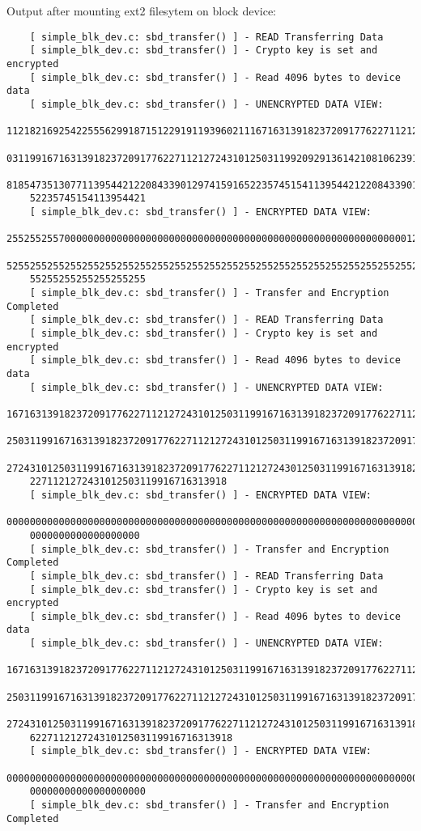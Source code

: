 \documentclass[onecolumn, draftclsnofoot,10pt, compsoc]{IEEEtran}
\begin{document}
\begin{enumerate}
    Output after mounting ext2 filesytem on block device:
    \begin{lstlisting}
    [ simple_blk_dev.c: sbd_transfer() ] - READ Transferring Data
    [ simple_blk_dev.c: sbd_transfer() ] - Crypto key is set and encrypted
    [ simple_blk_dev.c: sbd_transfer() ] - Read 4096 bytes to device data
    [ simple_blk_dev.c: sbd_transfer() ] - UNENCRYPTED DATA VIEW:
    11218216925422555629918715122919119396021116716313918237209177622711212724310125
    03119916716313918237209177622711212724310125031199209291361421081062391354813514
    81854735130771139544212208433901297415916522357451541139544212208433901297415916
    52235745154113954421
    [ simple_blk_dev.c: sbd_transfer() ] - ENCRYPTED DATA VIEW:
    25525525570000000000000000000000000000000000000000000000000000000000012825525525
    52552552552552552552552552552552552552552552552552552552552552552552552552552552
    55255255255255255255
    [ simple_blk_dev.c: sbd_transfer() ] - Transfer and Encryption Completed
    [ simple_blk_dev.c: sbd_transfer() ] - READ Transferring Data
    [ simple_blk_dev.c: sbd_transfer() ] - Crypto key is set and encrypted
    [ simple_blk_dev.c: sbd_transfer() ] - Read 4096 bytes to device data
    [ simple_blk_dev.c: sbd_transfer() ] - UNENCRYPTED DATA VIEW:
    16716313918237209177622711212724310125031199167163139182372091776227112127243101
    25031199167163139182372091776227112127243101250311991671631391823720917762271121
    27243101250311991671631391823720917762271121272430125031199167163139182372091776
    2271121272431012503119916716313918
    [ simple_blk_dev.c: sbd_transfer() ] - ENCRYPTED DATA VIEW:
    00000000000000000000000000000000000000000000000000000000000000000000000000000000
    0000000000000000000
    [ simple_blk_dev.c: sbd_transfer() ] - Transfer and Encryption Completed
    [ simple_blk_dev.c: sbd_transfer() ] - READ Transferring Data
    [ simple_blk_dev.c: sbd_transfer() ] - Crypto key is set and encrypted
    [ simple_blk_dev.c: sbd_transfer() ] - Read 4096 bytes to device data
    [ simple_blk_dev.c: sbd_transfer() ] - UNENCRYPTED DATA VIEW:
    16716313918237209177622711212724310125031199167163139182372091776227112127243101
    25031199167163139182372091776227112127243101250311991671631391823720917762271121
    27243101250311991671631391823720917762271121272431012503119916716313918237209177
    62271121272431012503119916716313918
    [ simple_blk_dev.c: sbd_transfer() ] - ENCRYPTED DATA VIEW:
    00000000000000000000000000000000000000000000000000000000000000000000000000000000
    00000000000000000000
    [ simple_blk_dev.c: sbd_transfer() ] - Transfer and Encryption Completed

\end{lstlisting}
\end{enumerate}
\end{document}
